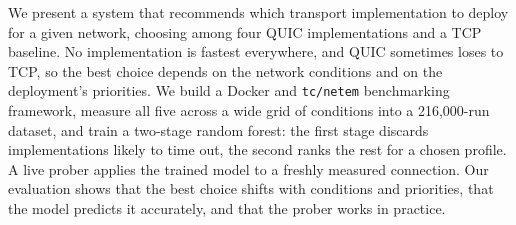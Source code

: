 We present a system that recommends which transport implementation to deploy
for a given network, choosing among four QUIC implementations and a TCP
baseline. No implementation is fastest everywhere, and QUIC sometimes loses to
TCP, so the best choice depends on the network conditions and on the
deployment's priorities. We build a Docker and \texttt{tc/netem} benchmarking
framework, measure all five across a wide grid of conditions into a
216,000-run dataset, and train a two-stage random forest: the first stage
discards implementations likely to time out, the second ranks the rest for a
chosen profile. A live prober applies the trained model to a freshly measured
connection. Our evaluation shows that the best choice shifts with conditions
and priorities, that the model predicts it accurately, and that the prober
works in practice.
